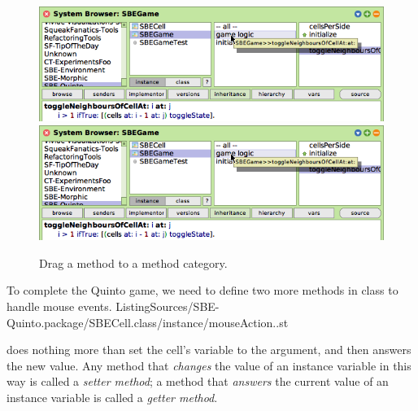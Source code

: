 \documentclass[a4paper,10pt,twoside]{book}
\begin{document}
\begin{figure}[htbp]
   \centering
   \ifluluelse
		{\includegraphics[width=\textwidth]{DragMethod} }
		{\includegraphics[scale=0.7]{DragMethod} }
   \caption{Drag a method to a method category.\label{fig:dragMethod}}
\end{figure}

To complete the Quinto game, we need to define two more methods in class  to handle mouse events.
%
{ListingSources/SBE-Quinto.package/SBECell.class/instance/mouseAction..st}

 does nothing more than set the cell's  variable to the argument, and then answers the new value.
Any method that \emph{changes} the value of an instance variable in this way is called a \emph{setter method}; a method that \emph{answers} the current value of an instance variable is called a \emph{getter method}.
\end{document}
